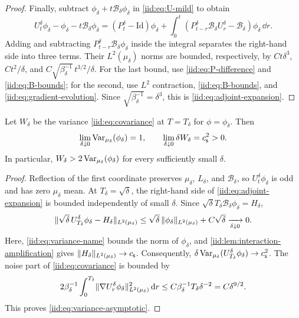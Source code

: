 \documentclass[11pt,reqno]{amsart}
\numberwithin{equation}{section}
\theoremstyle{plain}
\theoremstyle{remark}
\DeclarePairedDelimiter{\norm}{\lVert}{\rVert}
\newcommand{\Id}{\mathrm{Id}}
\begin{document}
\begin{proof}
Finally, subtract $\phi_\delta+t\mathcal B_\delta\phi_\delta$ in \eqref{iid:eq:U-mild} to obtain
\begin{equation}\label{iid:eq:three-errors}
 U_t^\delta\phi_\delta-\phi_\delta-t\mathcal B_\delta\phi_\delta
 =(P_t^\delta-\Id)\phi_\delta
 +\int_0^t(P_{t-r}^\delta\mathcal B_\delta U_r^\delta-\mathcal B_\delta)\phi_\delta\,\dd r.
\end{equation}
Adding and subtracting $P_{t-r}^\delta\mathcal B_\delta\phi_\delta$ inside the integral separates the right-hand side into three terms. Their $L^2(\mu_\delta)$ norms are bounded, respectively, by $Ct\delta^3$, $Ct^2/\delta$, and $C\sqrt{\beta_\delta^{-1}}\,t^{3/2}/\delta$. For the last bound, use \eqref{iid:eq:P-difference} and \eqref{iid:eq:B-bounds}; for the second, use $L^2$ contraction, \eqref{iid:eq:B-bounds}, and \eqref{iid:eq:gradient-evolution}. Since $\sqrt{\beta_\delta^{-1}}=\delta^3$, this is \eqref{iid:eq:adjoint-expansion}.
\end{proof}

\begin{prop}\label{iid:prop:variance-crossing}
Let $W_\delta$ be the variance \eqref{iid:eq:covariance} at $T=T_\delta$ for $\phi=\phi_\delta$. Then
\begin{equation}\label{iid:eq:variance-asymptotic}
 \lim_{\delta\downarrow0}\operatorname{Var}_{\mu_\delta}(\phi_\delta)=1,\qquad
 \lim_{\delta\downarrow0}\delta W_\delta=c_{\mathsf{s}}^2>0.
\end{equation}
In particular, $W_\delta>2\operatorname{Var}_{\mu_\delta}(\phi_\delta)$ for every sufficiently small $\delta$.
\end{prop}
\begin{proof}
Reflection of the first coordinate preserves $\mu_\delta$, $L_\delta$, and $\mathcal B_\delta$, so $U_t^\delta\phi_\delta$ is odd and has zero $\mu_\delta$ mean. At $T_\delta=\sqrt\delta$, the right-hand side of \eqref{iid:eq:adjoint-expansion} is bounded independently of small $\delta$. Since $\sqrt\delta T_\delta\mathcal B_\delta\phi_\delta=H_\delta$,
\begin{equation}\label{iid:eq:leading-amplification}
 \norm{\sqrt\delta\,U_{T_\delta}^\delta\phi_\delta-H_\delta}_{L^2(\mu_\delta)}
 \le\sqrt\delta\,\norm{\phi_\delta}_{L^2(\mu_\delta)}+C\sqrt\delta
 \xrightarrow[\delta\downarrow0]{}0.
\end{equation}
Here, \eqref{iid:eq:variance-name} bounds the norm of $\phi_\delta$, and \cref{iid:lem:interaction-amplification} gives $\norm{H_\delta}_{L^2(\mu_\delta)}\to c_\s$. Consequently, $\delta\operatorname{Var}_{\mu_\delta}(U_{T_\delta}^\delta\phi_\delta)\to c_{\mathsf{s}}^2$. The noise part of \eqref{iid:eq:covariance} is bounded by
\begin{equation}\label{iid:eq:noise-small}
 2\beta_\delta^{-1}\int_0^{T_\delta}\norm{\nabla U_r^\delta\phi_\delta}_{L^2(\mu_\delta)}^2\dd r
 \le C \beta_\delta^{-1} T_\delta\delta^{-2}=C\delta^{9/2}.
\end{equation}
This proves \eqref{iid:eq:variance-asymptotic}.
\end{proof}
\end{document}
